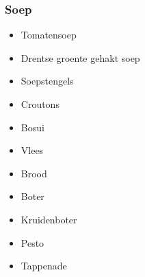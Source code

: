 \subsubsection*{Soep}
\begin{itemize}
	\item	Tomatensoep
	\item	Drentse groente gehakt soep
	\item	Soepstengels
	\item	Croutons
	\item	Bosui
	\item	Vlees
	\item	Brood
	\item	Boter
	\item	Kruidenboter
	\item	Pesto
	\item	Tappenade
\end{itemize}
